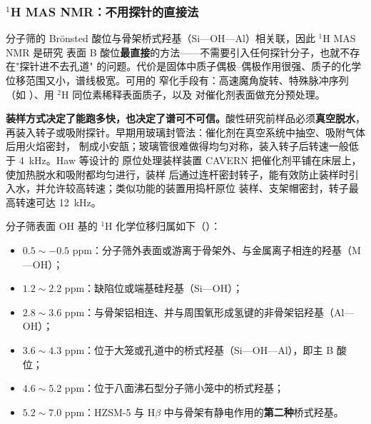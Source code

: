\subsubsection{$^{1}$H MAS NMR：不用探针的直接法}
\label{sec:h1-acidity}

分子筛的 Brönsted 酸位与骨架桥式羟基（Si—OH—Al）相关联，因此 $^{1}$H MAS NMR 是研究
表面 B 酸位\textbf{最直接}的方法——不需要引入任何探针分子，也就不存在"探针进不去孔道"
的问题。代价是固体中质子偶极--偶极作用很强、质子的化学位移范围又小，谱线极宽。可用的
窄化手段有：高速魔角旋转、特殊脉冲序列（如 ）、用 $^{2}$H 同位素稀释表面质子，以及
对催化剂表面做充分预处理。

\begin{measure}
\textbf{装样方式决定了能跑多快，也决定了谱可不可信。}酸性研究前样品必须\textbf{真空脱水}，
再装入转子或吸附探针。早期用玻璃封管法：催化剂在真空系统中抽空、吸附气体后用火焰密封，
制成小安瓿；玻璃管很难做得均匀对称，装入转子后转速一般低于 \qty{4}{kHz}。Haw 等设计的
原位处理装样装置 CAVERN 把催化剂平铺在床层上，使加热脱水和吸附都均匀进行，装样
后通过连杆密封转子，能有效防止装样时引入水，并允许较高转速；类似功能的装置用捣杆原位
装样、支架帽密封，转子最高转速可达 \qty{12}{kHz}。
\end{measure}

分子筛表面 OH 基的 $^{1}$H 化学位移归属如下（）：

\begin{itemize}[leftmargin=1.6em,itemsep=1pt,topsep=2pt]
\item $0.5\sim-0.5$ ppm：分子筛外表面或游离于骨架外、与金属离子相连的羟基（M—OH）；
\item $1.2\sim2.2$ ppm：缺陷位或端基硅羟基（Si—OH）；
\item $2.8\sim3.6$ ppm：与骨架铝相连、并与周围氧形成氢键的非骨架铝羟基（Al—OH）；
\item $3.6\sim4.3$ ppm：位于大笼或孔道中的桥式羟基（Si—OH—Al），即主 B 酸位；
\item $4.6\sim5.2$ ppm：位于八面沸石型分子筛小笼中的桥式羟基；
\item $5.2\sim7.0$ ppm：HZSM-5 与 H$\beta$ 中与骨架有静电作用的\textbf{第二种}桥式羟基。
\end{itemize}

